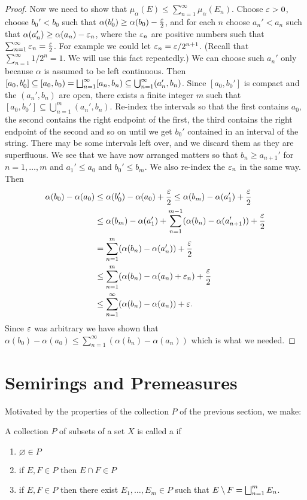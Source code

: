 \begin{proof}
Now we need to show that $\mu_\alpha(E)\leq\sum_{n=1}^\infty\mu_\alpha(E_n)$. Choose $\varepsilon>0$, choose $b_0'<b_0$ such that $\alpha(b_0')\geq\alpha(b_0)-\frac{\varepsilon}2$, and for each $n$ choose $a_n'<a_n$ such that $\alpha(a_n')\geq\alpha(a_n)-\varepsilon_n$, where the $\varepsilon_n$ are positive numbers such that $\sum_{n=1}^\infty\varepsilon_n=\frac{\varepsilon}2$. For example we could let $\varepsilon_n=\varepsilon/2^{n+1}$. (Recall that $\sum_{n=1}^\infty 1/2^n=1$. We will use this fact repeatedly.) We can choose such $a_n'$ only because $\alpha$ is assumed to be left continuous. Then $[a_0,b_0']\subseteq[a_0,b_0)=\bigsqcup_{n=1}^\infty[a_n,b_n)\subseteq\bigcup_{n=1}^\infty(a_n',b_n)$. Since $[a_0,b_0']$ is compact and the $(a_n',b_n)$ are open, there exists a finite integer $m$ such that $[a_0,b_0']\subseteq\bigcup_{n=1}^m(a_n',b_n)$. Re-index the intervals so that the first contains $a_0$, the second contains the right endpoint of the first, the third contains the right endpoint of the second and so on until we get $b_0'$ contained in an interval of the string. There may be some intervals left over, and we discard them as they are superfluous. We see that we have now arranged matters so that $b_n\geq a_{n+1}'$ for $n=1,\dots,m$ and $a_1'\leq a_0$ and $b_0'\leq b_m$. We also re-index the $\varepsilon_n$ in the same way. Then
\begin{align*}
    \alpha(b_0)-\alpha(a_0)&\leq\alpha(b_0')-\alpha(a_0)+\frac{\varepsilon}2\leq\alpha(b_m)-\alpha(a_1')+\frac{\varepsilon}2\\
    &\leq\alpha(b_m)-\alpha(a_1')+\sum_{n=1}^{m-1}(\alpha(b_n)-\alpha(a_{n+1}'))+\frac{\varepsilon}2\\
    &=\sum_{n=1}^m(\alpha(b_n)-\alpha(a_n'))+\frac{\varepsilon}2\\
    &\leq\sum_{n=1}^m(\alpha(b_n)-\alpha(a_n)+\varepsilon_n)+\frac{\varepsilon}2\\
    &\leq\sum_{n=1}^\infty(\alpha(b_n)-\alpha(a_n))+\varepsilon.
\end{align*}Since $\varepsilon$ was arbitrary we have shown that $\alpha(b_0)-\alpha(a_0)\leq\sum_{n=1}^\infty(\alpha(b_n)-\alpha(a_n))$ which is what we needed.
\end{proof}

\section{Semirings and Premeasures}

Motivated by the properties of the collection $P$ of the previous section, we make:

\begin{definition}
A collection $P$ of subsets of a set $X$ is called a  if
\begin{enumerate}[label=\arabic*)]
    \item $\varnothing\in P$
    \item if $E,F\in P$ then $E\cap F\in P$
    \item if $E,F\in P$ then there exist $E_1,\dots,E_m\in P$ such that $E\setminus F=\bigsqcup_{n=1}^mE_n$.
\end{enumerate}
\end{definition}

